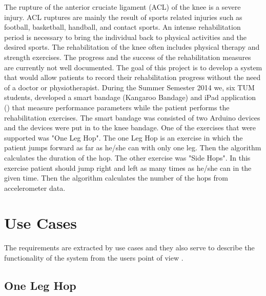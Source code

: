 The rupture of the anterior cruciate ligament (ACL) of the knee is a severe injury. ACL ruptures are mainly the result of sports related injuries such as football, basketball, handball, and contact sports. An intense rehabilitation period is necessary to bring the individual back to physical activities and the desired sports. The rehabilitation of the knee often includes physical therapy and strength exercises. The progress and the success of the rehabilitation measures are currently not well documented. The goal of this project is to develop a system that would allow patients to record their rehabilitation progress without the need of a doctor or physiotherapist. During the Summer Semester 2014 we, six TUM students, developed a smart bandage (Kangaroo Bandage) and iPad application (\kneehapp) that measure performance parameters while the patient performs the rehabilitation exercises. The smart bandage was consisted of two Arduino devices and the devices were put in to the knee bandage. One of the exercises that were supported was "One Leg Hop". The one Leg Hop is an exercise in which the patient jumps forward as far as he/she can with only one leg. Then the algorithm calculates the duration of the hop. The other exercise was "Side Hops". In this exercise patient should jump right and left as many times as he/she can in the given time. Then the algorithm calculates the number of the hops from accelerometer data.


\section{Use Cases}

The requirements are extracted by use cases and they also serve to describe the functionality of the system from the users point of view \cite{Bruegge2004}.

\subsection{	One Leg Hop}

